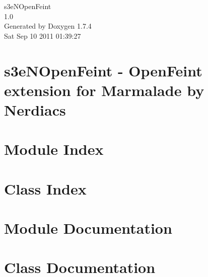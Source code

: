 \documentclass[a4paper]{book}
\begin{document}
\hypersetup{pageanchor=false}
\begin{titlepage}
\vspace*{7cm}
\begin{center}
{\Large s3eNOpenFeint \\[1ex]\large 1.0 }\\
\vspace*{1cm}
{\large Generated by Doxygen 1.7.4}\\
\vspace*{0.5cm}
{\small Sat Sep 10 2011 01:39:27}\\
\end{center}
\end{titlepage}
\clearemptydoublepage
{}
\tableofcontents
\clearemptydoublepage
{}
\hypersetup{pageanchor=true}
\chapter{s3eNOpenFeint -\/ OpenFeint extension for Marmalade by Nerdiacs}
\label{index}\hypertarget{index}{}
\chapter{Module Index}

\chapter{Class Index}

\chapter{Module Documentation}


\chapter{Class Documentation}










\printindex
\end{document}
